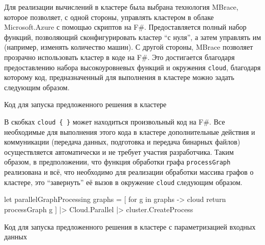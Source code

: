 Для реализации вычислений в кластере была выбрана технология MBrace, которое позволяет, с одной стороны, управлять кластером в облаке Microsoft.Azure с помощью скриптов на F\#. Предоставляется полный набор функций, позволяющий сконфигурировать кластер ``с нуля'', а затем управлять им (например, изменять количество машин). С другой стороны, MBrace позволяет прозрачно использовать кластер в коде на F\#. Это достигается благодаря предоставлению набора высокоуровневых функций и окружения \texttt{cloud}, благодаря которому код, предназначенный для выполнения в кластере можно задать следующим образом.

\begin{listing}
\caption{Код для запуска предложенного решения в кластере}
\label{lst:mbraceExample}
\end{listing}

В скобках \verb|cloud { }| может находиться произвольный код на F\#. Все необходимые для выполнения этого кода в кластере дополнительные действия и коммуникации (передача данных, подготовка и передача бинарных файлов) осуществляется автоматически и не требует участия разработчика. Таким образом, в предположении, что функция обработки графа \texttt{processGraph}  реализована и всё, что необходимо для реализации обработки массива графов о кластере, это ``завернуть'' её вызов в окружение \texttt{cloud} следующим образом.

\begin{listing}
    \begin{pyglist}[language=ocaml,numbers=left,numbersep=5pt]
    
let parallelGraphProcessing graphs = 
    [ for g in graphs -> cloud { return processGraph g } ]
    |> Cloud.Parallel
    |> cluster.CreateProcess

\end{pyglist}
\caption{Код для запуска предложенного решения в кластере с параметризацией входных данных}
\label{lst:mbraceExample}
\end{listing}
